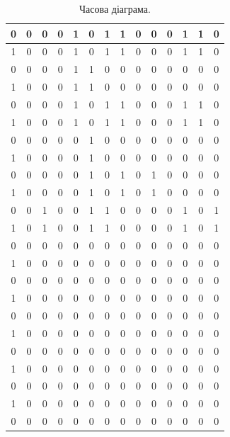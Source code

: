 \documentclass[a4paper, 10pt]{article}
\begin{document}
\begin{table}[h!]
\begin{tabular}{|c|c|c|c|c|c|c|c|c|c|c|c|c|c|}
\hline
0 & 0 & 0 & 0 & 1 & 0 & 1 & 1 & 0 & 0 & 0 & 1 & 1 & 0\\
\hline
1 & 0 & 0 & 0 & 1 & 0 & 1 & 1 & 0 & 0 & 0 & 1 & 1 & 0\\
\hline
0 & 0 & 0 & 0 & 1 & 1 & 0 & 0 & 0 & 0 & 0 & 0 & 0 & 0\\
\hline
1 & 0 & 0 & 0 & 1 & 1 & 0 & 0 & 0 & 0 & 0 & 0 & 0 & 0\\
\hline
0 & 0 & 0 & 0 & 1 & 0 & 1 & 1 & 0 & 0 & 0 & 1 & 1 & 0\\
\hline
1 & 0 & 0 & 0 & 1 & 0 & 1 & 1 & 0 & 0 & 0 & 1 & 1 & 0\\
\hline
0 & 0 & 0 & 0 & 0 & 1 & 0 & 0 & 0 & 0 & 0 & 0 & 0 & 0\\
\hline
1 & 0 & 0 & 0 & 0 & 1 & 0 & 0 & 0 & 0 & 0 & 0 & 0 & 0\\
\hline
0 & 0 & 0 & 0 & 0 & 1 & 0 & 1 & 0 & 1 & 0 & 0 & 0 & 0\\
\hline
1 & 0 & 0 & 0 & 0 & 1 & 0 & 1 & 0 & 1 & 0 & 0 & 0 & 0\\
\hline
0 & 0 & 1 & 0 & 0 & 1 & 1 & 0 & 0 & 0 & 0 & 1 & 0 & 1\\
\hline
1 & 0 & 1 & 0 & 0 & 1 & 1 & 0 & 0 & 0 & 0 & 1 & 0 & 1\\
\hline
0 & 0 & 0 & 0 & 0 & 0 & 0 & 0 & 0 & 0 & 0 & 0 & 0 & 0\\
\hline
1 & 0 & 0 & 0 & 0 & 0 & 0 & 0 & 0 & 0 & 0 & 0 & 0 & 0\\
\hline
0 & 0 & 0 & 0 & 0 & 0 & 0 & 0 & 0 & 0 & 0 & 0 & 0 & 0\\
\hline
1 & 0 & 0 & 0 & 0 & 0 & 0 & 0 & 0 & 0 & 0 & 0 & 0 & 0\\
\hline
0 & 0 & 0 & 0 & 0 & 0 & 0 & 0 & 0 & 0 & 0 & 0 & 0 & 0\\
\hline
1 & 0 & 0 & 0 & 0 & 0 & 0 & 0 & 0 & 0 & 0 & 0 & 0 & 0\\
\hline
0 & 0 & 0 & 0 & 0 & 0 & 0 & 0 & 0 & 0 & 0 & 0 & 0 & 0\\
\hline
1 & 0 & 0 & 0 & 0 & 0 & 0 & 0 & 0 & 0 & 0 & 0 & 0 & 0\\
\hline
0 & 0 & 0 & 0 & 0 & 0 & 0 & 0 & 0 & 0 & 0 & 0 & 0 & 0\\
\hline
1 & 0 & 0 & 0 & 0 & 0 & 0 & 0 & 0 & 0 & 0 & 0 & 0 & 0\\
\hline
0 & 0 & 0 & 0 & 0 & 0 & 0 & 0 & 0 & 0 & 0 & 0 & 0 & 0\\
\hline
\end{tabular}
\caption{Часова діаграма.}
\end{table}
\end{document}
